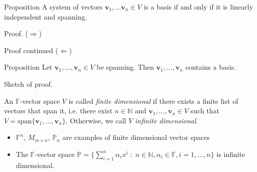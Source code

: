 \documentclass [aspectratio=169]{beamer}
\newcommand{\bv}{{\mathbf{v}}}
\newcommand{\N}{{\mathbb{N}}}
\newcommand{\F}{{\mathbb{F}}}
\begin{document}
\begin{frame}
\begin{exampleblock}{Proposition}
 A system of vectors $\bv_1, \ldots \bv_n \in V$ is a basis if and only if it is linearly independent and spanning.
 \end{exampleblock}
\begin{block}{Proof.}
($\Rightarrow$)
\vspace{4cm}
\end{block}
\end{frame}


\begin{frame}
\begin{block}{Proof continued}
($\Leftarrow$)
\vspace{4.5cm}
\end{block}
\end{frame}


\begin{frame}
\begin{exampleblock}{Proposition}
 Let $\bv_1,\ldots, \bv_n\in V$ be spanning. Then $\bv_1,\ldots, \bv_n$ contains a basis.
 \end{exampleblock}
 
 \vspace{1em}
 
\begin{block}{Sketch of proof.}
\vspace{3cm}
\end{block}
\end{frame}



\begin{frame}
\begin{definition}
An $\F$-vector space $V$ is called \emph{finite dimensional} if there exists a finite list of vectors that span it, i.e. there exist $n\in \N$ and $\bv_1,\ldots, \bv_n\in V$ such that $V= \mathrm{span}\{\bv_1,\ldots,\bv_n\}$. Otherwise, we call $V$ \emph{infinite dimensional}.
\end{definition}

\begin{example}
\begin{itemize}
    \item $\F^n$, $M_{m\times n}$, $\mathbb{P}_n$ are examples of finite dimensional vector spaces
    \item The $\F$-vector space $\mathbb{P} = \{ \sum_{i=1}^n \alpha_i x^i  \; \colon \; n\in \N, \alpha_i \in \F, i=1,\ldots,n\}$ is infinite dimensional. 
\end{itemize}
\vspace{2.5cm}
\end{example}
\end{frame}
\end{document}
